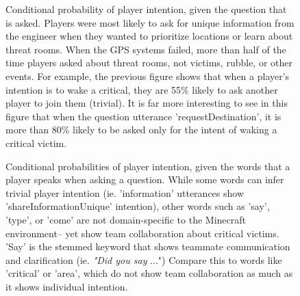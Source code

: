 \begin{figure}[h!]
    \centering
    \caption{ Conditional probability of player intention, given the question that is asked. Players were most likely to ask for unique information from the engineer when they wanted to prioritize locations or learn about threat rooms. When the GPS systems failed, more than half of the time players asked about threat rooms, not victims, rubble, or other events. For example, the previous figure shows that when a player's intention is to wake a critical, they are 55\% likely to ask another player to join them (trivial). It is far more interesting to see in this figure that when the question utterance 'requestDestination', it is more than 80\% likely to be asked only for the intent of waking a critical victim.}
\end{figure}


    
\begin{figure}[h!]
    \centering
    \caption{Conditional probabilities of player intention, given the words that a player speaks when asking a question. While some words can infer trivial player intention (ie. 'information' utterances show 'shareInformationUnique' intention), other words such as 'say', 'type', or 'come' are not domain-specific to the Minecraft environment-- yet show team collaboration about critical victims. 'Say' is the stemmed keyword that shows teammate communication and clarification (ie. \emph{"Did you say} ...") Compare this to words like 'critical' or 'area', which do not show team collaboration as much as it shows individual intention. }
    \end{figure}

